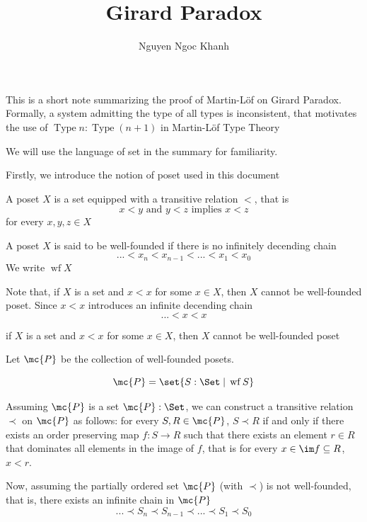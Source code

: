 \documentclass{article}
\title{
	Girard Paradox
}
\author{Nguyen Ngoc Khanh}
\DeclareMathOperator{\wf}{wf}
\DeclareMathOperator{\Type}{Type}
\begin{document}
	
\maketitle

This is a short note summarizing the proof of Martin-Löf \cite{martin1972intuitionistic} on Girard Paradox. Formally, a system admitting the type of all types is inconsistent, that motivates the use of $\Type n: \Type (n+1)$ in Martin-Löf Type Theory

We will use the language of set in the summary for familiarity.

Firstly, we introduce the notion of poset used in this document

\begin{definition}[poset]
	A poset $X$ is a set equipped with a transitive relation $<$, that is
	$$
		x < y \text{ and } y < z \text{ implies } x < z
	$$
	for every $x, y, z \in X$
\end{definition}

\begin{definition}
	A poset $X$ is said to be well-founded if there is no infinitely decending chain 
	$$
		... < x_n < x_{n-1} < ... < x_1 < x_0
	$$
	We write $\wf X$
\end{definition}

Note that, if $X$ is a set and $x < x$ for some $x \in X$, then $X$ cannot be well-founded poset. Since $x < x$ introduces an infinite decending chain
$$
... < x < x
$$

\begin{lemma}
	\label{lemma3}
	if $X$ is a set and $x < x$ for some $x \in X$, then $X$ cannot be well-founded poset
\end{lemma}

Let $\mc{P}$ be the collection of well-founded posets.

$$
	\mc{P} = \set{S: \Set \; | \; \wf S}
$$

Assuming $\mc{P}$ is a set $\mc{P}: \Set$, we can construct a transitive relation $\prec$ on $\mc{P}$ as follows: for every $S, R \in \mc{P}$, $S \prec R$ if and only if there exists an order preserving map $f: S \to R$ such that there exists an element $r \in R$ that dominates all elements in the image of $f$, that is for every $x \in \im f \subseteq R$, $x < r$.

Now, assuming the partially ordered set $\mc{P}$ (with $\prec$) is not well-founded, that is, there exists an infinite chain in $\mc{P}$
$$
	... \prec S_n \prec S_{n-1} \prec ... \prec S_1 \prec S_0
$$
\end{document}
